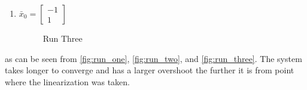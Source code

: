 \begin{enumerate}
\begin{enumerate}
    \item $\bar x_0 = \begin{bmatrix} -1 \\ 1\end{bmatrix}$\\
      \begin{figure}[H]
  \begin{center}
  \end{center}
  \caption{Run Three}
  \label{fig:run_three}
\end{figure}

    \end{enumerate}
    as can be seen from \autoref{fig:run_one}, \autoref{fig:run_two}, and \autoref{fig:run_three}. The system
    takes longer to converge and has a larger overshoot the further it is from point where the linearization
    was taken.


\end{enumerate}
